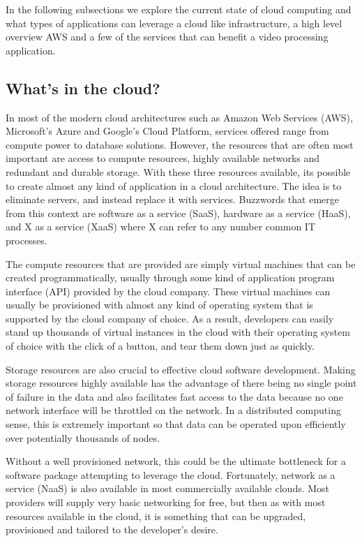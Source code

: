 In the following subsections we explore the current state of cloud computing and
what types of applications can leverage a cloud like infrastructure, a high
level overview AWS and a few of the services that can benefit a video processing
application.

\subsection{\label{subsection:in_the_cloud}What's in the cloud?}
In most of the modern cloud architectures such as Amazon Web Services (AWS),
Microsoft's Azure and Google's Cloud Platform, services offered range from
compute power to database solutions. However, the resources that are often
most important are access to compute resources, highly available networks and
redundant and durable storage. With these three resources available, its possible
to create almost any kind of application in a cloud architecture. The idea is
to eliminate servers, and instead replace it with services. Buzzwords
that emerge from this context are software as a service (SaaS), hardware as a service
(HaaS), and X as a service (XaaS) where X can refer to any number common IT
processes.

The compute resources that are provided are simply virtual machines that can be
created programmatically, usually through some kind of application program
interface (API) provided by the cloud company. These virtual machines can
usually be provisioned with almost any kind of operating system that is
supported by the cloud company of choice. As a result, developers can easily
stand up thousands of virtual instances in the cloud with their operating system
of choice with the click of a button, and tear them down just as quickly.

Storage resources are also crucial to effective cloud software development.
Making storage resources highly available has the advantage of there being
no single point of failure in the data and also facilitates fast access to the
data because no one network interface will be throttled on the network. In a
distributed computing sense, this is extremely important so that data can be operated
upon efficiently over potentially thousands of nodes.

Without a well provisioned network, this could be the ultimate bottleneck for
a software package attempting to leverage the cloud. Fortunately, network as a
service (NaaS) is also available in most commercially available clouds. Most
providers will supply very basic networking for free, but then as with most
resources available in the cloud, it is something that can be upgraded, provisioned
and tailored to the developer's desire.


